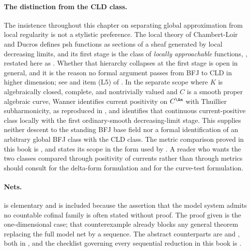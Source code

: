 \paragraph{The distinction from the CLD class.}
The insistence throughout this chapter on separating global approximation
from local regularity is not a stylistic preference.  The local theory of
Chambert-Loir and Ducros \cite{CLD25} defines psh functions as sections of a
sheaf generated by local decreasing limits, and its first stage is the class
of \emph{locally approachable} functions,
\cite[Definition~8.1.13]{CLD25}, restated here as
.  Whether that hierarchy collapses at the first
stage is open in general, and it is the reason no formal argument passes from
BFJ to CLD in higher dimension; see
 and item (L5) of
.  In the separate scope where $K$ is
algebraically closed, complete, and nontrivially valued and $C$ is a smooth
proper algebraic curve, Wanner \cite{Wanner19} identifies current positivity
on $C^{\An}$ with Thuillier subharmonicity, as reproduced in
, and
 identifies that
continuous current-positive class locally with the first ordinary-smooth
decreasing-limit stage.  This supplies neither descent to the standing BFJ
base field nor a formal identification of an arbitrary global BFJ class with
the CLD class.  The metric comparison proved in this book is
, and
 states its scope in the form used by
.  A reader who wants the two classes compared through
positivity of currents rather than through metrics should consult
\cite{GK17,GK19} for the delta-form formulation and
\cite{GR25Classical,GR25PL} for the curve-test formulation.

\paragraph{Nets.}
 is elementary and is included because
the assertion that the model system admits no countable cofinal family is
often stated without proof.  The proof given is the one-dimensional case;
that counterexample already blocks any general theorem replacing the full
model net by a sequence.  The abstract counterparts are
 and
, both in
, and the checklist governing every sequential
reduction in this book is .

